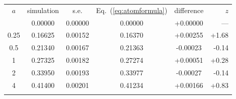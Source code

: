 \begin{tabular}{@{}cccccr@{}}
\toprule
$a$ & simulation & s.e. & Eq.~(\ref{eq:atomformula}) & difference & $z$ \\
\colrule
0 & 0.00000 & 0.00000 & 0.00000 & +0.00000 & --- \\
0.25 & 0.16625 & 0.00152 & 0.16370 & +0.00255 & +1.68 \\
0.5 & 0.21340 & 0.00167 & 0.21363 & -0.00023 & -0.14 \\
1 & 0.27325 & 0.00182 & 0.27274 & +0.00051 & +0.28 \\
2 & 0.33950 & 0.00193 & 0.33977 & -0.00027 & -0.14 \\
4 & 0.41400 & 0.00201 & 0.41234 & +0.00166 & +0.83 \\
\botrule
\end{tabular}